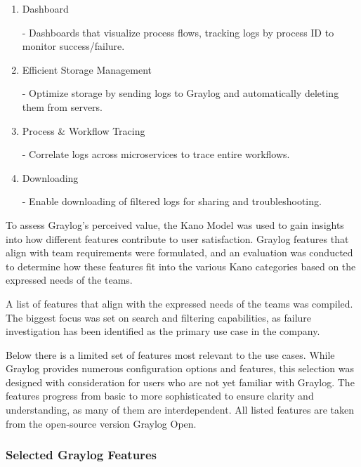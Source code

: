 \documentclass[../main.tex]{subfiles}
\begin{document}
\begin{enumerate}
   \item Dashboard
   
    -  Dashboards that visualize process flows, tracking logs by process ID to monitor success/failure.

    \item Efficient Storage Management
    
   - Optimize storage by sending logs to Graylog and automatically deleting them from servers.

   \item Process \& Workflow Tracing
   
   - Correlate logs across microservices to trace entire workflows.

   \item Downloading
   
   - Enable downloading of filtered logs for sharing and troubleshooting.

\end{enumerate}

To assess Graylog's perceived value, the Kano Model was used to gain insights into how different features contribute to user satisfaction. Graylog features that align with team requirements were formulated, and an evaluation was conducted to determine how these features fit into the various Kano categories based on the expressed needs of the teams.

A list of features that align with the expressed needs of the teams was compiled. The biggest focus was set on search and filtering capabilities, as failure investigation has been identified as the primary use case in the company.

Below there is a limited set of features most relevant to the use cases. While Graylog provides numerous configuration options and features, this selection was designed with consideration for users who are not yet familiar with Graylog. The features progress from basic to more sophisticated to ensure clarity and understanding, as many of them are interdependent. All listed features are taken from the open-source version Graylog Open.

\subsubsection{Selected Graylog Features}
\end{document}
